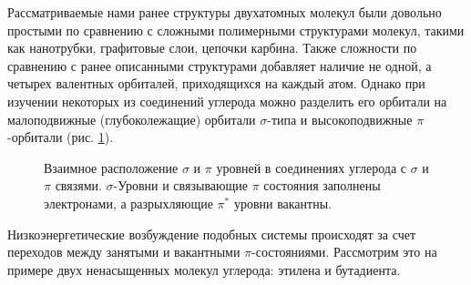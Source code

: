 Рассматриваемые нами ранее структуры двухатомных молекул были довольно простыми по сравнению с сложными полимерными структурами молекул, такими как нанотрубки, графитовые слои, цепочки карбина. 
Также сложности по сравнению с ранее описанными структурами добавляет наличие не одной, а четырех валентных орбиталей, приходящихся на каждый атом.
Однако при изучении некоторых из соединений углерода можно разделить его орбитали на малоподвижные (глубоколежащие) орбитали $\sigma$-типа и высокоподвижные $\pi$-орбитали (рис. \ref{fig:PiSigma}).

\begin{figure}
\caption{Взаимное расположение $\sigma$ 
и $\pi$ уровней в соединениях углерода 
с $\sigma$ и $\pi$ связями. $\sigma$-Уровни
 и связывающие $\pi$ состояния заполнены электронами, а разрыхляющие $\pi^{*}$ уровни вакантны. \cite{dyachkov2011}}
\label{fig:PiSigma}
\end{figure}

Низкоэнергетические возбуждение подобных системы происходят за счет переходов между занятыми и вакантными $\pi$-состояниями. 
Рассмотрим это на примере двух ненасыщенных молекул углерода: этилена и бутадиента.

